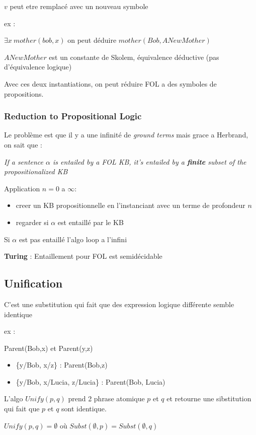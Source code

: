		$v$ peut etre remplacé avec un nouveau symbole
		
		ex :
		
		$\exists x  \ mother(bob,x)$ on peut déduire $mother(Bob, ANewMother)$
		
		$ANewMother$ est un constante de Skolem, équivalence déductive (pas d'équivalence logique)
		
		Avec ces deux instantiations, on peut réduire FOL a des symboles de propositions.
		
		\subsubsection{Reduction to Propositional Logic}	
			Le problème est que il y a une infinité de \textit{ground terms} mais grace a Herbrand, on sait que :
			
			\textit{If a sentence $\alpha$ is entailed by a FOL KB, it's entailed by a \textbf{finite} subset of the propositionalized KB}
			
			Application $n=0$ a $\infty$:
			\begin{itemize}
				\item creer un KB propositionnelle en l'instanciant avec un terme de profondeur $n$
				\item regarder si $\alpha$ est entaillé par le KB
			\end{itemize}
			
			Si $\alpha$ est pas entaillé l'algo loop a l'infini
			
			\textbf{Turing} : Entaillement pour FOL est semidécidable
			
	\subsection{Unification}
		C'est une substitution qui fait que des expression logique différente semble identique
		
		ex : 
		
		Parent(Bob,x) et Parent(y,z)
		\begin{itemize}
			\item \{y/Bob, x/z\} : Parent(Bob,z)
			\item \{y/Bob, x/Lucia, z/Lucia\} : Parent(Bob, Lucia)
		\end{itemize}	
		
		L'algo $Unify(p,q)$ prend 2 phrase atomique $p$ et $q$ et retourne une sibstitution qui fait que $p$ et $q$ sont identique.
		
		$Unify(p,q) = \emptyset$ où $Subst(\emptyset, p) = Subst(\emptyset, q)$
		
